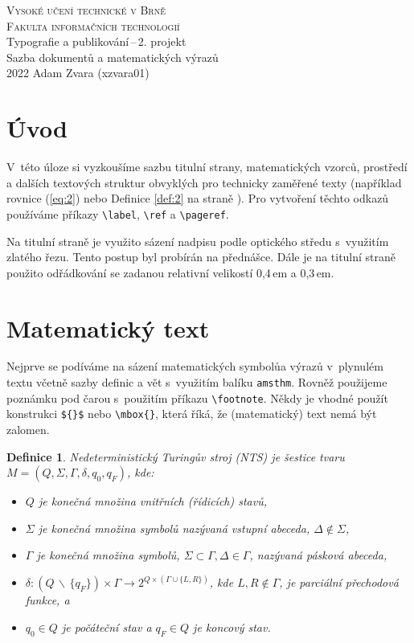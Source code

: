 \documentclass[11pt, twocolumn]{article}
\newtheorem{definition}{Definice}
\begin{document}
\begin{titlepage}
\begin{center}
    \Huge
    \textsc{Vysoké učení technické v Brně\\[-0.2em]
    \huge
    Fakulta informačních technologií}\\
    \LARGE
    Typografie a publikování\,--\,2. projekt\\
    Sazba dokumentů a matematických výrazů\\
    \Large
    2022 \hfill Adam Zvara (xzvara01) 
\end{center}
\end{titlepage}

\section*{Úvod}
V~této úloze si vyzkoušíme sazbu titulní strany, matematických vzorců, prostředí a dalších textových struktur obvyklých pro technicky zaměřené texty (například rovnice (\ref{eq:2}) nebo Definice \ref{def:2} na straně \pageref{def:2}). Pro vytvoření těchto odkazů používáme příkazy \verb|\label|, \verb|\ref| a \verb|\pageref|.

Na titulní straně je využito sázení nadpisu podle optického středu s~využitím zlatého řezu. Tento postup byl probírán na přednášce. Dále je na titulní straně použito odřádkování se zadanou relativní velikostí 0,4\,em a 0,3\,em.

\section{Matematický text}
Nejprve se podíváme na sázení matematických symbolů\linebreak a výrazů v~plynulém textu včetně sazby definic a vět s~vy\-užitím balíku \verb|amsthm|. Rovněž použijeme poznámku pod čarou s~použitím příkazu \verb|\footnote|. Někdy je vhodné použít konstrukci \verb|${}$| nebo \verb|\mbox{}|, která říká, že (matematický) text nemá být zalomen. 


\begin{definition}
\emph{Nedeterministický Turingův stroj} (NTS) je šestice tvaru $M = (Q, \Sigma, \Gamma, \delta, q_0, q_F)$, kde:
\begin{itemize}
    \item $Q$ je konečná množina \emph{vnitřních (řídicích) stavů},
    \item $\Sigma$ je konečná množina symbolů nazývaná \emph{vstupní abeceda}, $\Delta \notin \Sigma$,
    \item $\Gamma$ je konečná množina symbolů, $\Sigma \subset \Gamma, \Delta \in \Gamma$, nazývaná \emph{pásková abeceda},
    \item $\delta : (Q\,\backslash\,\{q_F\}) \times \Gamma \rightarrow 2^{Q \times (\Gamma \cup \{L,R\})}$, kde $L, R \notin \Gamma$, je parciální \emph{přechodová funkce}, a
    \item $q_0 \in Q$ je \emph{počáteční stav} a $q_F \in Q$ je \emph{koncový stav}.
\end{itemize}
\end{definition}
\end{document}
